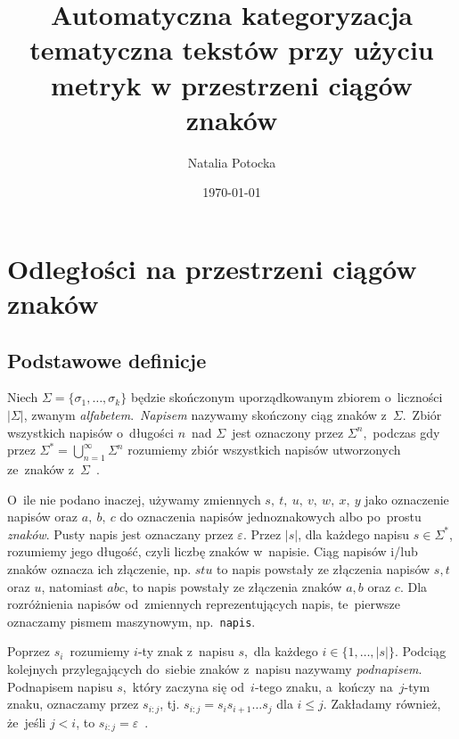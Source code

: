\documentclass{praca1}
\author{Natalia Potocka}
\title{Automatyczna kategoryzacja tematyczna tekstów przy użyciu metryk w przestrzeni ciągów znaków}
\date{\today}
\begin{document}
%
%
%

\chapter{Odległości na przestrzeni ciągów znaków}
\label{metryki-na-przestrzeni-ciagow-znakow}


\section{Podstawowe definicje}


\begin{definition}
Niech  $\Sigma = \{\sigma_1, \ldots, \sigma_k\}$ będzie skończonym uporządkowanym zbiorem o~liczności $|\Sigma|$, zwanym \emph{alfabetem}.~\emph{Napisem} nazywamy skończony ciąg znaków z~$\Sigma$.~Zbiór wszystkich napisów o~długości $n$~nad $\Sigma$~jest oznaczony przez $\Sigma^n$,~podczas gdy przez $\Sigma^* = \bigcup_{n=1}^{\infty}\Sigma^n$ rozumiemy zbiór wszystkich napisów utworzonych ze~znaków z~$\Sigma$~\cite{Boytsov2011:indexingmethods}.
\end{definition}

O~ile nie podano inaczej, używamy zmiennych $s,\ t,\ u,\ v,\ w,\ x,\ y$ jako oznaczenie napisów oraz $a,\ b,\ c$ do oznaczenia napisów jednoznakowych albo po~prostu \emph{znaków}. Pusty napis jest oznaczany przez $\varepsilon$. Przez $|s|$, dla każdego napisu $s \in \Sigma^*$, rozumiemy jego długość, czyli liczbę znaków w~napisie. Ciąg napisów i/lub znaków oznacza ich złączenie, np. $stu$ to napis powstały ze złączenia napisów $s, t$ oraz $u$, natomiast $abc$, to napis powstały ze złączenia znaków $a, b$ oraz $c$. Dla rozróżnienia napisów od~zmiennych reprezentujących napis, te~pierwsze oznaczamy pismem maszynowym, np.~\verb|napis|.

Poprzez $s_i$~rozumiemy $i$-ty znak z~napisu $s$,~dla każdego $i \in \{1,\ldots,|s|\}$. Podciąg kolejnych przylegających do~siebie znaków z~napisu nazywamy \emph{podnapisem}. Podnapisem napisu $s$,~który zaczyna się od~$i$-tego znaku, a~kończy na~$j$-tym znaku, oznaczamy przez $s_{i:j}$, tj. $s_{i:j} = s_is_{i+1}\ldots s_j$ dla $i \leq j$. Zakładamy również, że~jeśli $j < i$, to $s_{i:j} = \varepsilon$~\cite{Boytsov2011:indexingmethods,Loo2014:stringdist}.
\end{document}

